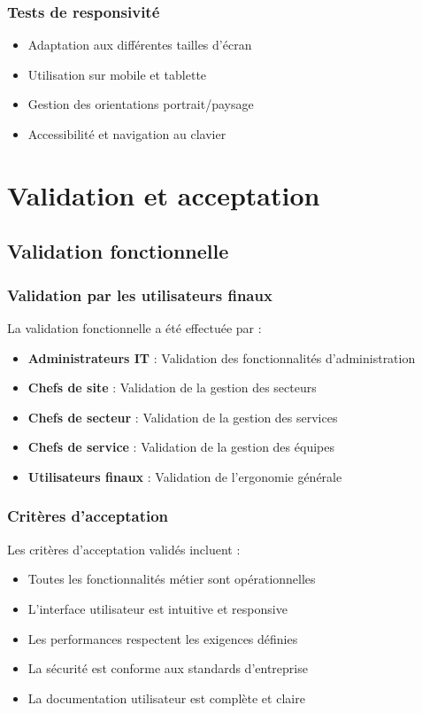 \subsubsection{Tests de responsivité}
\begin{itemize}
    \item Adaptation aux différentes tailles d'écran
    \item Utilisation sur mobile et tablette
    \item Gestion des orientations portrait/paysage
    \item Accessibilité et navigation au clavier
\end{itemize}

\section{Validation et acceptation}
\subsection{Validation fonctionnelle}
\subsubsection{Validation par les utilisateurs finaux}
La validation fonctionnelle a été effectuée par :
\begin{itemize}
    \item \textbf{Administrateurs IT} : Validation des fonctionnalités d'administration
    \item \textbf{Chefs de site} : Validation de la gestion des secteurs
    \item \textbf{Chefs de secteur} : Validation de la gestion des services
    \item \textbf{Chefs de service} : Validation de la gestion des équipes
    \item \textbf{Utilisateurs finaux} : Validation de l'ergonomie générale
\end{itemize}

\subsubsection{Critères d'acceptation}
Les critères d'acceptation validés incluent :
\begin{itemize}
    \item Toutes les fonctionnalités métier sont opérationnelles
    \item L'interface utilisateur est intuitive et responsive
    \item Les performances respectent les exigences définies
    \item La sécurité est conforme aux standards d'entreprise
    \item La documentation utilisateur est complète et claire
\end{itemize}

